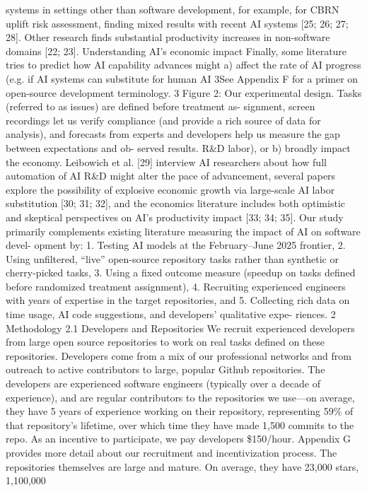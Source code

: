 systems in settings other than software development, for example, for CBRN uplift risk assessment,
finding mixed results with recent AI systems [25; 26; 27; 28]. Other research finds substantial
productivity increases in non-software domains [22; 23].
Understanding AI’s economic impact
Finally, some literature tries to predict how AI capability
advances might a) affect the rate of AI progress (e.g. if AI systems can substitute for human AI
3See Appendix F for a primer on open-source development terminology.
3
Figure 2: Our experimental design. Tasks (referred to as issues) are defined before treatment as-
signment, screen recordings let us verify compliance (and provide a rich source of data for analysis),
and forecasts from experts and developers help us measure the gap between expectations and ob-
served results.
R\&D labor), or b) broadly impact the economy. Leibowich et al. [29] interview AI researchers
about how full automation of AI R\&D might alter the pace of advancement, several papers explore
the possibility of explosive economic growth via large-scale AI labor substitution [30; 31; 32], and
the economics literature includes both optimistic and skeptical perspectives on AI’s productivity
impact [33; 34; 35].
Our study primarily complements existing literature measuring the impact of AI on software devel-
opment by:
1. Testing AI models at the February–June 2025 frontier,
2. Using unfiltered, “live” open-source repository tasks rather than synthetic or cherry-picked
tasks,
3. Using a fixed outcome measure (speedup on tasks defined before randomized treatment
assignment),
4. Recruiting experienced engineers with years of expertise in the target repositories, and
5. Collecting rich data on time usage, AI code suggestions, and developers’ qualitative expe-
riences.
2
Methodology
2.1
Developers and Repositories
We recruit experienced developers from large open source repositories to work on real tasks defined
on these repositories. Developers come from a mix of our professional networks and from outreach
to active contributors to large, popular Github repositories. The developers are experienced software
engineers (typically over a decade of experience), and are regular contributors to the repositories
we use—on average, they have 5 years of experience working on their repository, representing 59\%
of that repository’s lifetime, over which time they have made 1,500 commits to the repo. As an
incentive to participate, we pay developers \$150/hour. Appendix G provides more detail about our
recruitment and incentivization process.
The repositories themselves are large and mature. On average, they have 23,000 stars, 1,100,000

